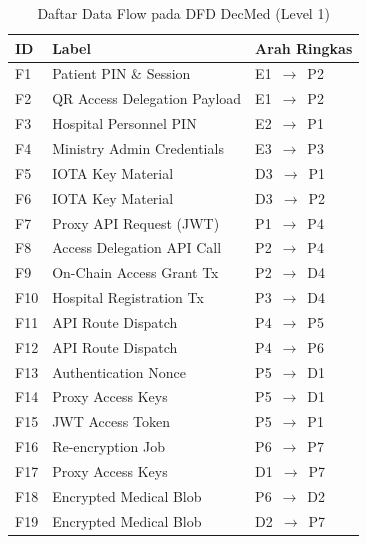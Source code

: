 \begin{table}[H]
	\centering
	\caption{Daftar Data Flow pada DFD DecMed (Level 1)}
	\label{tab:dfd-dataflow-level-1}
	\small
	\begin{tabular}{|p{}|p{}|p{}|}
		\hline
		\textbf{ID} & \textbf{Label}               & \textbf{Arah Ringkas} \\ \hline
		F1          & Patient PIN \& Session       & E1~$\rightarrow$~P2   \\ \hline
		F2          & QR Access Delegation Payload & E1~$\rightarrow$~P2   \\ \hline
		F3          & Hospital Personnel PIN       & E2~$\rightarrow$~P1   \\ \hline
		F4          & Ministry Admin Credentials   & E3~$\rightarrow$~P3   \\ \hline
		F5          & IOTA Key Material            & D3~$\rightarrow$~P1   \\ \hline
		F6          & IOTA Key Material            & D3~$\rightarrow$~P2   \\ \hline
		F7          & Proxy API Request (JWT)      & P1~$\rightarrow$~P4   \\ \hline
		F8          & Access Delegation API Call   & P2~$\rightarrow$~P4   \\ \hline
		F9          & On-Chain Access Grant Tx     & P2~$\rightarrow$~D4   \\ \hline
		F10         & Hospital Registration Tx     & P3~$\rightarrow$~D4   \\ \hline
		F11         & API Route Dispatch           & P4~$\rightarrow$~P5   \\ \hline
		F12         & API Route Dispatch           & P4~$\rightarrow$~P6   \\ \hline
		F13         & Authentication Nonce         & P5~$\rightarrow$~D1   \\ \hline
		F14         & Proxy Access Keys            & P5~$\rightarrow$~D1   \\ \hline
		F15         & JWT Access Token             & P5~$\rightarrow$~P1   \\ \hline
		F16         & Re-encryption Job            & P6~$\rightarrow$~P7   \\ \hline
		F17         & Proxy Access Keys            & D1~$\rightarrow$~P7   \\ \hline
		F18         & Encrypted Medical Blob       & P6~$\rightarrow$~D2   \\ \hline
		F19         & Encrypted Medical Blob       & D2~$\rightarrow$~P7   \\ \hline

\end{tabular}
\end{table}
